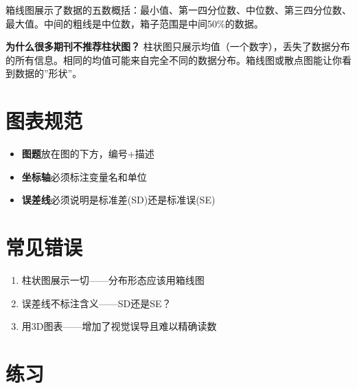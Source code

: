 \documentclass[
  letterpaper,
]{scrbook}
\providecommand{\tightlist}{%
  \setlength{\itemsep}{0pt}\setlength{\parskip}{0pt}}
\begin{document}
箱线图展示了数据的五数概括：最小值、第一四分位数、中位数、第三四分位数、最大值。中间的粗线是中位数，箱子范围是中间50\%的数据。

\begin{tcolorbox}[enhanced jigsaw, arc=.35mm, bottomrule=.15mm, bottomtitle=1mm, breakable, colback=white, colbacktitle=quarto-callout-tip-color!10!white, colframe=quarto-callout-tip-color-frame, coltitle=black, left=2mm, leftrule=.75mm, opacityback=0, opacitybacktitle=0.6, rightrule=.15mm, title=\textcolor{quarto-callout-tip-color}{\faLightbulb}\hspace{0.5em}{Tip}, titlerule=0mm, toprule=.15mm, toptitle=1mm]

\textbf{为什么很多期刊不推荐柱状图？}
柱状图只展示均值（一个数字），丢失了数据分布的所有信息。相同的均值可能来自完全不同的数据分布。箱线图或散点图能让你看到数据的''形状''。

\end{tcolorbox}

\section{图表规范}\label{ux56feux8868ux89c4ux8303}

\begin{itemize}
\tightlist
\item
  \textbf{图题}放在图的下方，编号+描述
\item
  \textbf{坐标轴}必须标注变量名和单位
\item
  \textbf{误差线}必须说明是标准差(SD)还是标准误(SE)
\end{itemize}

\section{常见错误}\label{ux5e38ux89c1ux9519ux8bef-4}

\begin{enumerate}
\def\labelenumi{\arabic{enumi}.}
\tightlist
\item
  柱状图展示一切------分布形态应该用箱线图
\item
  误差线不标注含义------SD还是SE？
\item
  用3D图表------增加了视觉误导且难以精确读数
\end{enumerate}

\section{练习}\label{ux7ec3ux4e60-6}
\end{document}
